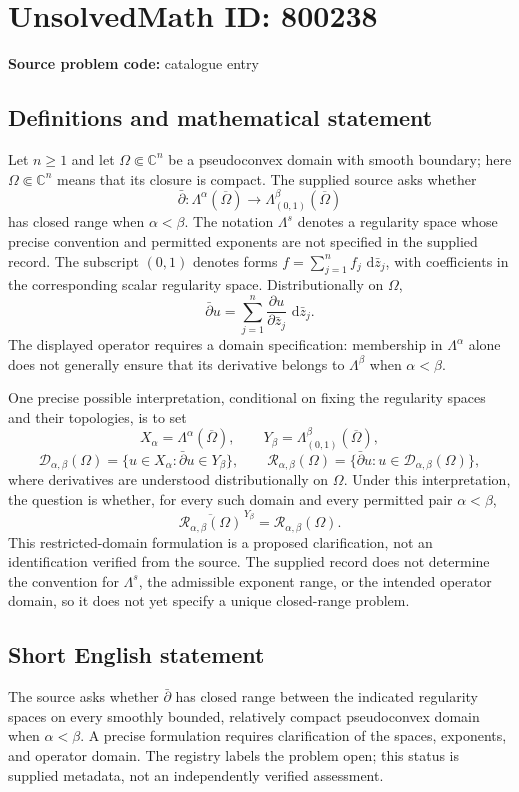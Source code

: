 \documentclass[11pt]{article}
\newcommand{\C}{\mathbb{C}}
\newcommand{\dd}{\,\mathrm{d}}
\begin{document}
\section*{UnsolvedMath ID: 800238}
\textbf{Source problem code:} catalogue entry
\subsection{Definitions and mathematical statement}
Let \(n\geq 1\) and let \(\Omega\Subset\C^n\) be a pseudoconvex domain with smooth boundary; here \(\Omega\Subset\C^n\) means that its closure is compact. The supplied source asks whether
\[
\bar\partial:\Lambda^\alpha(\overline\Omega)\longrightarrow\Lambda_{(0,1)}^\beta(\overline\Omega)
\]
has closed range when \(\alpha<\beta\). The notation \(\Lambda^s\) denotes a regularity space whose precise convention and permitted exponents are not specified in the supplied record. The subscript \((0,1)\) denotes forms \(f=\sum_{j=1}^n f_j\,\dd\bar z_j\), with coefficients in the corresponding scalar regularity space. Distributionally on \(\Omega\),
\[
\bar\partial u=\sum_{j=1}^n\frac{\partial u}{\partial\bar z_j}\,\dd\bar z_j.
\]
The displayed operator requires a domain specification: membership in \(\Lambda^\alpha\) alone does not generally ensure that its derivative belongs to \(\Lambda^\beta\) when \(\alpha<\beta\).

One precise possible interpretation, conditional on fixing the regularity spaces and their topologies, is to set
\[
X_\alpha=\Lambda^\alpha(\overline\Omega),\qquad
Y_\beta=\Lambda_{(0,1)}^\beta(\overline\Omega),
\]
\[
\mathcal D_{\alpha,\beta}(\Omega)
=\{u\in X_\alpha:\bar\partial u\in Y_\beta\},\qquad
\mathcal R_{\alpha,\beta}(\Omega)
=\{\bar\partial u:u\in\mathcal D_{\alpha,\beta}(\Omega)\},
\]
where derivatives are understood distributionally on \(\Omega\). Under this interpretation, the question is whether, for every such domain and every permitted pair \(\alpha<\beta\),
\[
\overline{\mathcal R_{\alpha,\beta}(\Omega)}^{\,Y_\beta}
=\mathcal R_{\alpha,\beta}(\Omega).
\]
This restricted-domain formulation is a proposed clarification, not an identification verified from the source. The supplied record does not determine the convention for \(\Lambda^s\), the admissible exponent range, or the intended operator domain, so it does not yet specify a unique closed-range problem.
\subsection{Short English statement}
The source asks whether \(\bar\partial\) has closed range between the indicated regularity spaces on every smoothly bounded, relatively compact pseudoconvex domain when \(\alpha<\beta\). A precise formulation requires clarification of the spaces, exponents, and operator domain. The registry labels the problem open; this status is supplied metadata, not an independently verified assessment.
\end{document}
